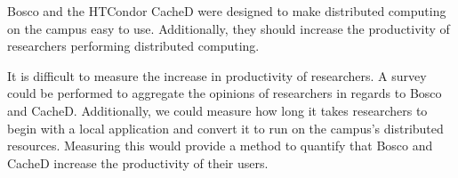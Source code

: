 Bosco and the HTCondor CacheD were designed to make distributed computing on the campus easy to use.  Additionally, they should increase the productivity of researchers performing distributed computing.

It is difficult to measure the increase in productivity of researchers.  A survey could be performed to aggregate the opinions of researchers in regards to Bosco and CacheD.  Additionally, we could measure how long it takes researchers to begin with a local application and convert it to run on the campus's distributed resources.  Measuring this would provide a method to quantify that Bosco and CacheD increase the productivity of their users.







